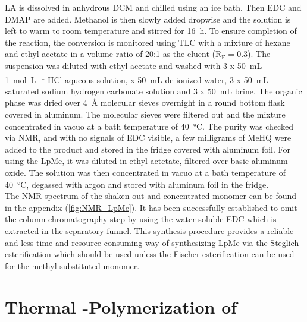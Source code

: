 \documentclass[11pt]{scrreport}
\begin{document}
	\gls{LA} is dissolved in anhydrous \gls{DCM} and chilled using an ice bath. Then \gls{EDC} and \gls{DMAP} are added. Methanol is then slowly added dropwise and the solution is left to warm to room temperature and stirred for \SI{16}{\hour}. To ensure completion of the reaction, the conversion is monitored using \gls{TLC} with a mixture of hexane and ethyl acetate in a volume ratio of 20:1 as the eluent ($\mathrm{R_F}=0.3$). The suspension was diluted with ethyl acetate and washed with 3 x \SI{50}{\milli\liter} \SI{1}{\mole\per\liter} HCl aqueous solution, x \SI{50}{\milli\liter} de-ionized water, 3 x \SI{50}{\milli\liter} saturated sodium hydrogen carbonate solution and 3 x \SI{50}{\milli\liter} brine. The organic phase was dried over \SI{4}{\AA} molecular sieves overnight in a round bottom flask covered in aluminum. The molecular sieves were filtered out and the mixture concentrated in vacuo at a bath temperature of \SI{40}{\degreeCelsius}. The purity was checked via \gls{NMR}, and with no signals of \gls{EDC} visible, a few milligrams of \gls{MeHQ} were added to the product and stored in the fridge covered with aluminum foil. For using the \gls{LpMe}, it was diluted in ethyl actetate, filtered over basic aluminum oxide. The solution was then concentrated in vacuo at a bath temperature of \SI{40}{\degreeCelsius}, degassed with argon and stored with aluminum foil in the fridge.\\
	The \gls{NMR} spectrum of the shaken-out and concentrated monomer can be found in the appendix (\autoref{fig:NMR_LpMe}). It has been successfully established to omit the column chromatography step by using the water soluble \gls{EDC} which is extracted in the separatory funnel. This synthesis procedure provides a reliable and less time and resource consuming way of synthesizing \gls{LpMe} via the Steglich esterification which should be used unless the Fischer esterification can be used for the methyl substituted monomer.
	\section{Thermal -Polymerization of }
\end{document}
